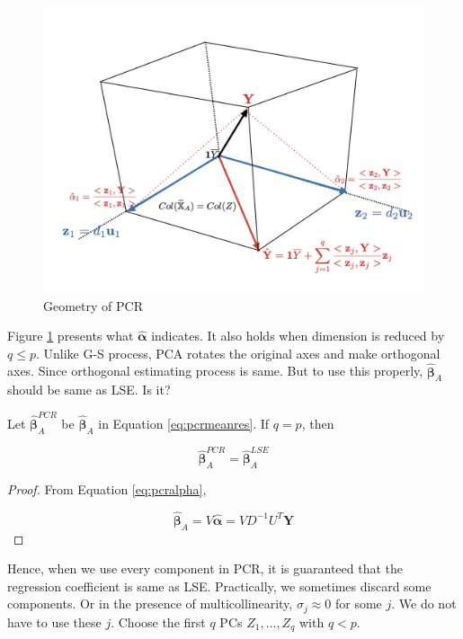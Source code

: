 \documentclass[]{book}
\theoremstyle{definition}
\theoremstyle{definition}
\theoremstyle{definition}
\theoremstyle{remark}
\let\BeginKnitrBlock\begin \let\EndKnitrBlock\end
\begin{document}
\begin{figure}[H]

{\centering \includegraphics[width=0.7\linewidth]{images/pcrfit} 

}

\caption{Geometry of PCR}\label{fig:pcrfig}
\end{figure}

Figure \ref{fig:pcrfig} presents what \(\hat{\boldsymbol\alpha}\) indicates. It also holds when dimension is reduced by \(q \le p\). Unlike G-S process, PCA rotates the original axes and make orthogonal axes. Since orthogonal estimating process is same. But to use this properly, \(\boldsymbol{\hat\beta}_{A}\) should be same as LSE. Is it?

\BeginKnitrBlock{remark}
{}Let \(\boldsymbol{\hat\beta}_{A}^{PCR}\) be \(\boldsymbol{\hat\beta}_{A}\) in Equation \eqref{eq:pcrmeanres}. If \(q = p\), then

\[\boldsymbol{\hat\beta}_{A}^{PCR} = \boldsymbol{\hat\beta}_{A}^{LSE}\]
\EndKnitrBlock{remark}

\BeginKnitrBlock{proof}
{}From Equation \eqref{eq:pcralpha},

\begin{equation}
  \boldsymbol{\hat\beta}_{A} = V \hat{\boldsymbol\alpha} = VD^{-1}U^T \mathbf{Y}
  \label{eq:pcrlse}
\end{equation}
\EndKnitrBlock{proof}

Hence, when we use every component in PCR, it is guaranteed that the regression coefficient is same as LSE. Practically, we sometimes discard some components. Or in the presence of multicollinearity, \(\sigma_j \approx 0\) for some \(j\). We do not have to use these \(j\). Choose the first \(q\) PCs \(Z_1, \ldots, Z_q\) with \(q < p\).
\end{document}
